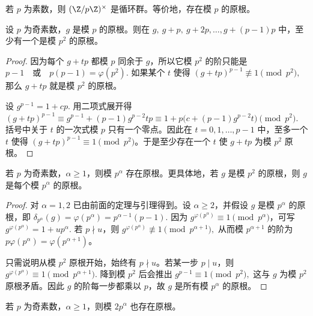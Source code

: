 \begin{theorem}[模素数存在原根]
若 $p$ 为素数，则 $\U p$ 是循环群。等价地，存在模 $p$ 的原根。
\end{theorem}

\begin{lemma}[从模 $p$ 提升到模 $p^2$]
设 $p$ 为奇素数，$g$ 是模 $p$ 的原根。则在
\(
  g,\ g+p,\ g+2p,\ldots,g+(p-1)p
\)
中，至少有一个是模 $p^2$ 的原根。
\end{lemma}

\begin{proof}
因为每个 $g+tp$ 都模 $p$ 同余于 $g$，所以它模 $p^2$ 的阶只能是
\(
  p-1\quad\text{或}\quad p(p-1)=\varphi(p^2).
\)
如果某个 $t$ 使得
\(
  (g+tp)^{p-1}\not\equiv 1\pmod {p^2},
\)
那么 $g+tp$ 就是模 $p^2$ 的原根。

设
\(
  g^{p-1}=1+cp.
\)
用二项式展开得
\(
  (g+tp)^{p-1}
  \equiv
  g^{p-1}+(p-1)g^{p-2}tp
  \equiv
  1+p\bigl(c+(p-1)g^{p-2}t\bigr)
  \pmod {p^2}.
\)
括号中关于 $t$ 的一次式模 $p$ 只有一个零点。因此在 $t=0,1,\ldots,p-1$ 中，至多一个 $t$ 使得
$(g+tp)^{p-1}\equiv 1\pmod {p^2}$。于是至少存在一个 $t$ 使 $g+tp$ 为模 $p^2$ 原根。
\end{proof}

\begin{theorem}[奇素数幂模原根]
若 $p$ 为奇素数，$\alpha\ge 1$，则模 $p^\alpha$ 存在原根。更具体地，若 $g$ 是模 $p^2$ 的原根，则 $g$ 是每个模
$p^\alpha$ 的原根。
\end{theorem}

\begin{proof}
对 $\alpha=1,2$ 已由前面的定理与引理得到。设 $\alpha\ge 2$，并假设 $g$ 是模 $p^\alpha$ 的原根，即
\(
  \delta_{p^\alpha}(g)=\varphi(p^\alpha)=p^{\alpha-1}(p-1).
\)
因为 $g^{\varphi(p^\alpha)}\equiv 1\pmod {p^\alpha}$，可写
\(
  g^{\varphi(p^\alpha)}=1+up^\alpha.
\)
若 $p\nmid u$，则
\(
  g^{\varphi(p^\alpha)}\not\equiv 1\pmod {p^{\alpha+1}},
\)
从而模 $p^{\alpha+1}$ 的阶为 $p\varphi(p^\alpha)=\varphi(p^{\alpha+1})$。

只需说明从模 $p^2$ 原根开始，始终有 $p\nmid u$。若某一步 $p\mid u$，则
\(
  g^{\varphi(p^\alpha)}\equiv 1\pmod {p^{\alpha+1}}.
\)
降到模 $p^2$ 后会推出
\(
  g^{p-1}\equiv 1\pmod {p^2},
\)
这与 $g$ 为模 $p^2$ 原根矛盾。因此 $g$ 的阶每一步都乘以 $p$，故 $g$ 是所有模 $p^\alpha$ 的原根。
\end{proof}

\begin{corollary}
若 $p$ 为奇素数，$\alpha\ge 1$，则模 $2p^\alpha$ 也存在原根。
\end{corollary}

